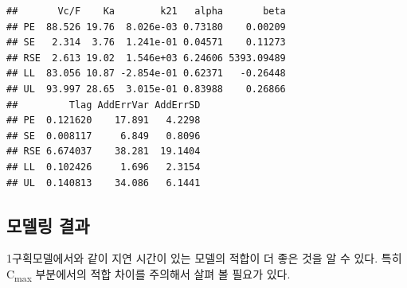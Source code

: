 \documentclass[
  11pt,
  krantz2, a4paper, twoside]{krantz}
\newenvironment{Shaded}{\begin{snugshade}}{\end{snugshade}}
\newcommand{\AttributeTok}[1]{\textcolor[rgb]{0.13,0.29,0.53}{#1}}
\newcommand{\DecValTok}[1]{\textcolor[rgb]{0.00,0.00,0.81}{#1}}
\newcommand{\FunctionTok}[1]{\textcolor[rgb]{0.13,0.29,0.53}{\textbf{#1}}}
\newcommand{\NormalTok}[1]{#1}
\newcommand{\OtherTok}[1]{\textcolor[rgb]{0.56,0.35,0.01}{#1}}
\newcommand{\SpecialCharTok}[1]{\textcolor[rgb]{0.81,0.36,0.00}{\textbf{#1}}}
\newcommand{\StringTok}[1]{\textcolor[rgb]{0.31,0.60,0.02}{#1}}
\theoremstyle{definition}
\theoremstyle{definition}
\theoremstyle{definition}
\theoremstyle{definition}
\theoremstyle{remark}
\begin{document}
\begin{verbatim}
##       Vc/F    Ka        k21   alpha       beta
## PE  88.526 19.76  8.026e-03 0.73180    0.00209
## SE   2.314  3.76  1.241e-01 0.04571    0.11273
## RSE  2.613 19.02  1.546e+03 6.24606 5393.09489
## LL  83.056 10.87 -2.854e-01 0.62371   -0.26448
## UL  93.997 28.65  3.015e-01 0.83988    0.26866
##         Tlag AddErrVar AddErrSD
## PE  0.121620    17.891   4.2298
## SE  0.008117     6.849   0.8096
## RSE 6.674037    38.281  19.1404
## LL  0.102426     1.696   2.3154
## UL  0.140813    34.086   6.1441
\end{verbatim}

\subsection{모델링 결과}\label{uxbaa8uxb378uxb9c1-uxacb0uxacfc-2}

1구획모델에서와 같이 지연 시간이 있는 모델의 적합이 더 좋은 것을 알 수 있다. 특히 C\textsubscript{max} 부분에서의 적합 차이를 주의해서 살펴 볼 필요가 있다.

\begin{Shaded}
\end{Shaded}
\end{document}
